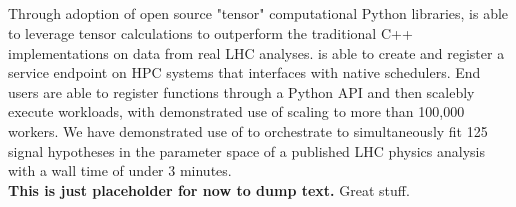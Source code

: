 \subsection{\pyhf{}}\label{subsec:pyhf}

Through adoption of open source "tensor" computational Python libraries, \pyhf{} is able to leverage tensor calculations to outperform the traditional C++ implementations on data from real LHC analyses.
\funcX{} is able to create and register a service endpoint on HPC systems that interfaces with native schedulers.
End users are able to register functions through a Python API and then scalebly execute workloads, with demonstrated use of scaling to more than 100,000 workers.
We have demonstrated use of \funcX{} to orchestrate \pyhf{} to simultaneously fit 125 signal hypotheses in the parameter space of a published LHC physics analysis with a wall time of under 3 minutes.\\

\textbf{This is just placeholder for now to dump text.}
Great stuff.~\cite{ATL-PHYS-PUB-2019-029}

